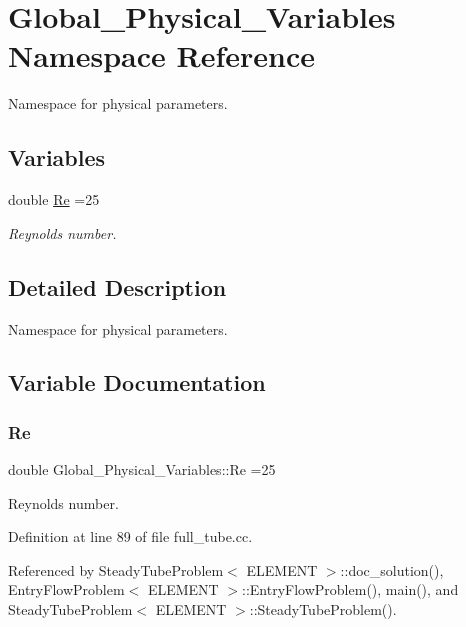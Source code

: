 \hypertarget{namespaceGlobal__Physical__Variables}{}\section{Global\+\_\+\+Physical\+\_\+\+Variables Namespace Reference}
\label{namespaceGlobal__Physical__Variables}


Namespace for physical parameters.  


\subsection*{Variables}
\begin{DoxyCompactItemize}
\item 
double \hyperlink{namespaceGlobal__Physical__Variables_ab814e627d2eb5bc50318879d19ab16b9}{Re} =25
\begin{DoxyCompactList}\small\item\em Reynolds number. \end{DoxyCompactList}\end{DoxyCompactItemize}


\subsection{Detailed Description}
Namespace for physical parameters. 

\subsection{Variable Documentation}
\mbox{\label{namespaceGlobal__Physical__Variables_ab814e627d2eb5bc50318879d19ab16b9}} 
\subsubsection{\texorpdfstring{Re}{Re}}
{\footnotesize\ttfamily double Global\+\_\+\+Physical\+\_\+\+Variables\+::\+Re =25}



Reynolds number. 



Definition at line 89 of file full\+\_\+tube.\+cc.



Referenced by Steady\+Tube\+Problem$<$ E\+L\+E\+M\+E\+N\+T $>$\+::doc\+\_\+solution(), Entry\+Flow\+Problem$<$ E\+L\+E\+M\+E\+N\+T $>$\+::\+Entry\+Flow\+Problem(), main(), and Steady\+Tube\+Problem$<$ E\+L\+E\+M\+E\+N\+T $>$\+::\+Steady\+Tube\+Problem().

